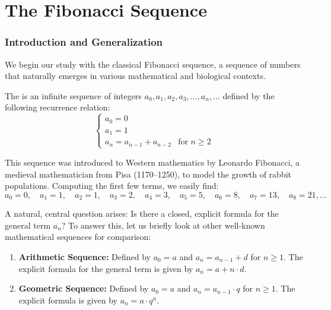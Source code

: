 \setcounter{chapter}{0}
\renewcommand{\thetheorem}{\thechapter.\arabic{theorem}}
\setcounter{theorem}{0}

\chapter{The Fibonacci Sequence}

\subsection{Introduction and Generalization}

We begin our study with the classical Fibonacci sequence, a sequence of numbers that naturally emerges in various mathematical and biological contexts.

\begin{definition}
The  is an infinite sequence of integers $a_0, a_1, a_2, a_3, \dots, a_n, \dots$ defined by the following recurrence relation:
\begin{equation} \label{eq:standard_fib_recurrence}
\begin{cases}
a_0 = 0 \\
a_1 = 1 \\
a_n = a_{n-1} + a_{n-2} & \text{for } n \ge 2
\end{cases}
\end{equation}
\end{definition}

\begin{remark}
This sequence was introduced to Western mathematics by Leonardo Fibonacci, a medieval mathematician from Pisa (1170--1250), to model the growth of rabbit populations. Computing the first few terms, we easily find:
\[
a_0 = 0, \quad a_1 = 1, \quad a_2 = 1, \quad a_3 = 2, \quad a_4 = 3, \quad a_5 = 5, \quad a_6 = 8, \quad a_7 = 13, \quad a_8 = 21, \dots
\]
\end{remark}

A natural, central question arises: Is there a closed, explicit formula for the general term $a_n$? To answer this, let us briefly look at other well-known mathematical sequences for comparison:
\begin{enumerate}
    \item \textbf{Arithmetic Sequence:} Defined by $a_0 = a$ and $a_n = a_{n-1} + d$ for $n \ge 1$. The explicit formula for the general term is given by $a_n = a + n \cdot d$.
    \item \textbf{Geometric Sequence:} Defined by $a_0 = a$ and $a_n = a_{n-1} \cdot q$ for $n \ge 1$. The explicit formula is given by $a_n = a \cdot q^n$.
\end{enumerate}

